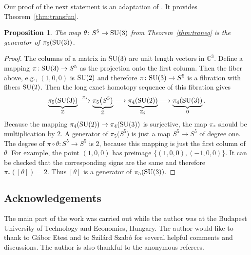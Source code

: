 \documentclass[pdftex]{sigma}
\numberwithin{equation}{section}
\newtheorem{Proposition}[Theorem]{Proposition}
 { \theoremstyle{definition}
\newtheorem{Definition}[Theorem]{Definition}
\newtheorem{Remark}[Theorem]{Remark} }
\newcommand{\SZ}{\mathbb{Z}} %
\newcommand{\SC}{\mathbb{C}} %
\begin{document}
Our proof of the next statement is an adaptation of \cite[Proposition~2]{chaves96complex}. It provides Theorem~\ref{thm:transfun}.
\begin{Proposition} The map $\theta\colon S^5 \rightarrow {\rm SU}(3)$ from Theorem~{\rm \ref{thm:traneq}} is the generator of $\pi_{5}({\rm SU}(3))$.
\end{Proposition}
\begin{proof} The columns of a matrix in ${\rm SU}(3)$ are unit length vectors in $\SC^3$. Define a mapping $\pi\colon {\rm SU}(3) \rightarrow S^5$ as the projection onto the first column. Then the fiber above, e.g., $(1,0,0)$ is ${\rm SU}(2)$ and therefore $\pi\colon {\rm SU}(3) \rightarrow S^5$ is a fibration with fibers ${\rm SU}(2)$. Then the long exact homotopy sequence of this fibration gives
 \[ \underbrace{\pi_5({\rm SU}(3))}_{\SZ} \overset{\pi_\ast}{\longrightarrow} \underbrace{\pi_5\big(S^5\big)}_{\SZ} \longrightarrow \underbrace{\pi_4({\rm SU}(2))}_{\SZ_2} \longrightarrow \underbrace{\pi_4({\rm SU}(3))}_{0}.\]
 Because the mapping $\pi_4({\rm SU}(2)) \rightarrow \pi_4({\rm SU}(3))$ is surjective, the map $\pi_\ast$ should be multiplication by 2. A generator of $\pi_5\big(S^5\big)$ is just a map $S^5 \rightarrow S^5$ of degree one. The degree of $\pi \circ \theta\colon S^5 \rightarrow S^5$ is 2, because this mapping is just the first column of $\theta$. For example, the point $(1,0,0)$ has preimage $\{(1,0,0),(-1,0,0)\}$. It can be checked that the corresponding signs are the same and therefore $\pi_\ast([\theta])=2$. Thus $[\theta]$ is a generator of $\pi_{5}({\rm SU}(3))$.
\end{proof}

\subsection*{Acknowledgements}
The main part of the work was carried out while the author was at the Budapest University of Technology and Economics, Hungary. The author would like to thank to G\'abor Etesi and to Szil\'ard Szab\'o for several helpful comments and discussions. The author is also thankful to the anonymous referees.
\end{document}
